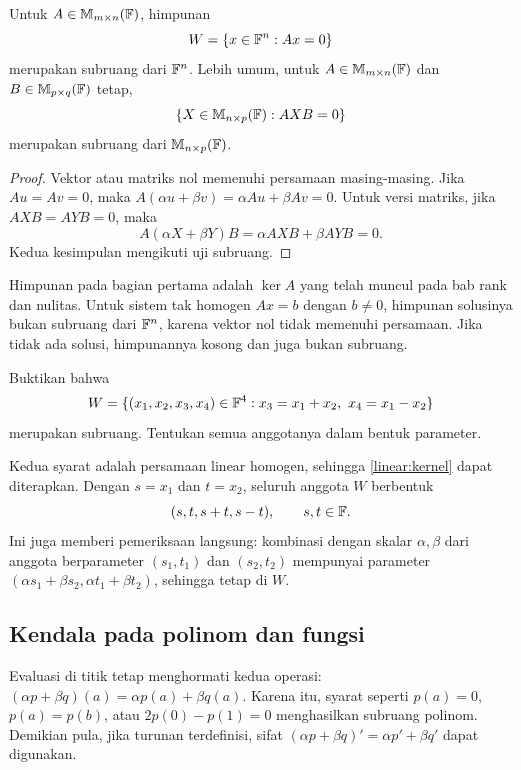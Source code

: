 \begin{prop}
    \label{linear:kernel}
    Untuk $A\in\mathbb{M}_{m\times n}(\mathbb{F})$, himpunan
    \[
        W=\{x\in\mathbb{F}^n:Ax=0\}
    \]
    merupakan subruang dari $\mathbb{F}^n$.
    Lebih umum, untuk $A\in\mathbb{M}_{m\times n}(\mathbb{F})$ dan
    $B\in\mathbb{M}_{p\times q}(\mathbb{F})$ tetap,
    \[
        \{X\in\mathbb{M}_{n\times p}(\mathbb{F}):AXB=0\}
    \]
    merupakan subruang dari $\mathbb{M}_{n\times p}(\mathbb{F})$.
\end{prop}
\begin{proof}
    Vektor atau matriks nol memenuhi persamaan masing-masing.
    Jika $Au=Av=0$, maka
    $A(\alpha u+\beta v)=\alpha Au+\beta Av=0$.
    Untuk versi matriks, jika $AXB=AYB=0$, maka
    \[
        A(\alpha X+\beta Y)B=\alpha AXB+\beta AYB=0.
    \]
    Kedua kesimpulan mengikuti uji subruang.
\end{proof}

Himpunan pada bagian pertama adalah $\ker A$ yang telah muncul
pada bab rank dan nulitas. Untuk sistem tak homogen $Ax=b$
dengan $b\ne0$, himpunan solusinya bukan subruang dari $\mathbb{F}^n$,
karena vektor nol tidak memenuhi persamaan. Jika tidak ada solusi,
himpunannya kosong dan juga bukan subruang.

\begin{exam}
    Buktikan bahwa
    \[
        W=\{(x_1,x_2,x_3,x_4)\in\mathbb{F}^4:
        x_3=x_1+x_2,\ x_4=x_1-x_2\}
    \]
    merupakan subruang. Tentukan semua anggotanya dalam bentuk parameter.
\end{exam}
\begin{solution}
    Kedua syarat adalah persamaan linear homogen, sehingga
    \autoref{linear:kernel} dapat diterapkan.
    Dengan $s=x_1$ dan $t=x_2$, seluruh anggota $W$ berbentuk
    \[
        (s,t,s+t,s-t),\qquad s,t\in\mathbb{F}.
    \]
    Ini juga memberi pemeriksaan langsung: kombinasi dengan skalar
    $\alpha,\beta$ dari anggota berparameter $(s_1,t_1)$ dan
    $(s_2,t_2)$ mempunyai parameter
    $(\alpha s_1+\beta s_2,\alpha t_1+\beta t_2)$, sehingga tetap di $W$.
\end{solution}

\subsection{Kendala pada polinom dan fungsi}

Evaluasi di titik tetap menghormati kedua operasi:
$(\alpha p+\beta q)(a)=\alpha p(a)+\beta q(a)$.
Karena itu, syarat seperti $p(a)=0$, $p(a)=p(b)$, atau
$2p(0)-p(1)=0$ menghasilkan subruang polinom.
Demikian pula, jika turunan terdefinisi, sifat
$(\alpha p+\beta q)'=\alpha p'+\beta q'$ dapat digunakan.

